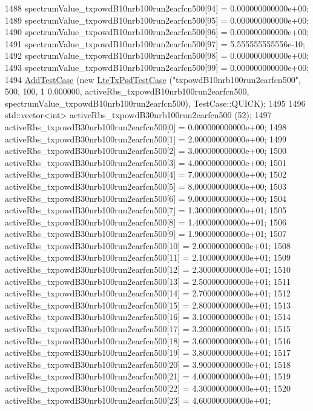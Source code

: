 \begin{DoxyCode}
1488   spectrumValue\_txpowdB10nrb100run2earfcn500[94] = 0.000000000000e+00;
1489   spectrumValue\_txpowdB10nrb100run2earfcn500[95] = 0.000000000000e+00;
1490   spectrumValue\_txpowdB10nrb100run2earfcn500[96] = 0.000000000000e+00;
1491   spectrumValue\_txpowdB10nrb100run2earfcn500[97] = 5.555555555556e-10;
1492   spectrumValue\_txpowdB10nrb100run2earfcn500[98] = 0.000000000000e+00;
1493   spectrumValue\_txpowdB10nrb100run2earfcn500[99] = 0.000000000000e+00;
1494   \hyperlink{classns3_1_1TestCase_a3718088e3eefd5d6454569d2e0ddd835}{AddTestCase} (\textcolor{keyword}{new} \hyperlink{classLteTxPsdTestCase}{LteTxPsdTestCase} (\textcolor{stringliteral}{"txpowdB10nrb100run2earfcn500"}, 500, 100, 1
      0.000000, activeRbs\_txpowdB10nrb100run2earfcn500, spectrumValue\_txpowdB10nrb100run2earfcn500), 
      TestCase::QUICK);
1495 
1496   std::vector<int> activeRbs\_txpowdB30nrb100run2earfcn500 (52);
1497   activeRbs\_txpowdB30nrb100run2earfcn500[0] = 0.000000000000e+00;
1498   activeRbs\_txpowdB30nrb100run2earfcn500[1] = 2.000000000000e+00;
1499   activeRbs\_txpowdB30nrb100run2earfcn500[2] = 3.000000000000e+00;
1500   activeRbs\_txpowdB30nrb100run2earfcn500[3] = 4.000000000000e+00;
1501   activeRbs\_txpowdB30nrb100run2earfcn500[4] = 7.000000000000e+00;
1502   activeRbs\_txpowdB30nrb100run2earfcn500[5] = 8.000000000000e+00;
1503   activeRbs\_txpowdB30nrb100run2earfcn500[6] = 9.000000000000e+00;
1504   activeRbs\_txpowdB30nrb100run2earfcn500[7] = 1.300000000000e+01;
1505   activeRbs\_txpowdB30nrb100run2earfcn500[8] = 1.400000000000e+01;
1506   activeRbs\_txpowdB30nrb100run2earfcn500[9] = 1.900000000000e+01;
1507   activeRbs\_txpowdB30nrb100run2earfcn500[10] = 2.000000000000e+01;
1508   activeRbs\_txpowdB30nrb100run2earfcn500[11] = 2.100000000000e+01;
1509   activeRbs\_txpowdB30nrb100run2earfcn500[12] = 2.300000000000e+01;
1510   activeRbs\_txpowdB30nrb100run2earfcn500[13] = 2.500000000000e+01;
1511   activeRbs\_txpowdB30nrb100run2earfcn500[14] = 2.700000000000e+01;
1512   activeRbs\_txpowdB30nrb100run2earfcn500[15] = 2.800000000000e+01;
1513   activeRbs\_txpowdB30nrb100run2earfcn500[16] = 3.100000000000e+01;
1514   activeRbs\_txpowdB30nrb100run2earfcn500[17] = 3.200000000000e+01;
1515   activeRbs\_txpowdB30nrb100run2earfcn500[18] = 3.600000000000e+01;
1516   activeRbs\_txpowdB30nrb100run2earfcn500[19] = 3.800000000000e+01;
1517   activeRbs\_txpowdB30nrb100run2earfcn500[20] = 3.900000000000e+01;
1518   activeRbs\_txpowdB30nrb100run2earfcn500[21] = 4.000000000000e+01;
1519   activeRbs\_txpowdB30nrb100run2earfcn500[22] = 4.300000000000e+01;
1520   activeRbs\_txpowdB30nrb100run2earfcn500[23] = 4.600000000000e+01;

\end{DoxyCode}
